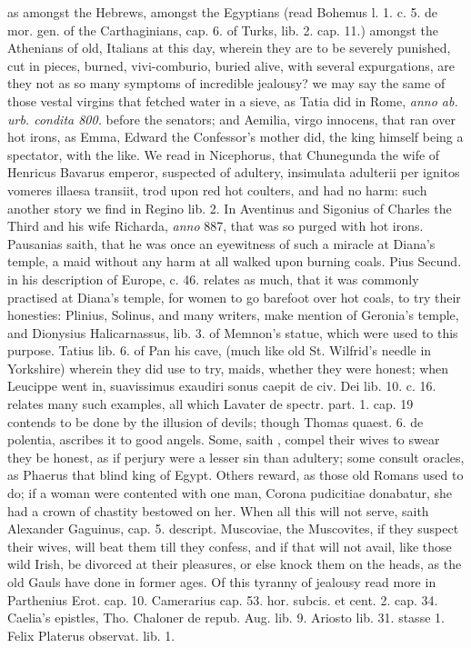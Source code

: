 as amongst the Hebrews, amongst the Egyptians (read Bohemus l. 1.
c. 5. de mor. gen. of the Carthaginians, cap. 6. of Turks, lib. 2. cap.
11.) amongst the Athenians of old, Italians at this day, wherein they
are to be severely punished, cut in pieces, burned, vivi-comburio,
buried alive, with several expurgations, \etc{} are they not as so many
symptoms of incredible jealousy? we may say the same of those vestal
virgins that fetched water in a sieve, as Tatia did in Rome, \emph{anno ab.
urb. condita 800.} before the senators; and Aemilia, virgo
innocens, that ran over hot irons, as Emma, Edward the Confessor's
mother did, the king himself being a spectator, with the like. We read
in Nicephorus, that Chunegunda the wife of Henricus Bavarus emperor,
suspected of adultery, insimulata adulterii per ignitos vomeres illaesa
transiit, trod upon red hot coulters, and had no harm: such another
story we find in Regino lib. 2. In Aventinus and Sigonius of Charles
the Third and his wife Richarda, \emph{anno} 887, that was so purged with hot
irons. Pausanias saith, that he was once an eyewitness of such a
miracle at Diana's temple, a maid without any harm at all walked upon
burning coals. Pius Secund. in his description of Europe, c. 46.
relates as much, that it was commonly practised at Diana's temple, for
women to go barefoot over hot coals, to try their honesties: Plinius,
Solinus, and many writers, make mention of Geronia's temple, and
Dionysius Halicarnassus, lib. 3. of Memnon's statue, which were used to
this purpose. Tatius lib. 6. of Pan his cave, (much like old St.
Wilfrid's needle in Yorkshire) wherein they did use to try, maids,
whether they were honest; when Leucippe went in, suavissimus
exaudiri sonus caepit \Austin{} de civ. Dei lib. 10. c. 16. relates many
such examples, all which Lavater de spectr. part. 1. cap. 19 contends
to be done by the illusion of devils; though Thomas quaest. 6. de
polentia, \etc{} ascribes it to good angels. Some, saith \Austin{},
compel their wives to swear they be honest, as if perjury were a lesser
sin than adultery; some consult oracles, as Phaerus that blind
king of Egypt. Others reward, as those old Romans used to do; if a
woman were contented with one man, Corona pudicitiae donabatur, she had
a crown of chastity bestowed on her. When all this will not serve,
saith Alexander Gaguinus, cap. 5. descript. Muscoviae, the Muscovites,
if they suspect their wives, will beat them till they confess, and if
that will not avail, like those wild Irish, be divorced at their
pleasures, or else knock them on the heads, as the old Gauls have
done in former ages. Of this tyranny of jealousy read more in
Parthenius Erot. cap. 10. Camerarius cap. 53. hor. subcis. et cent. 2.
cap. 34. Caelia's epistles, Tho. Chaloner de repub. Aug. lib. 9.
Ariosto lib. 31. stasse 1. Felix Platerus observat. lib. 1. \etc{}

